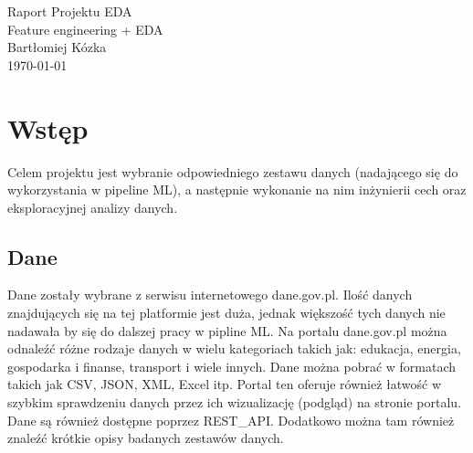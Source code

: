 \documentclass[10pt,a4paper]{article}
\begin{document}
\begin{titlepage}
    \centering
    \vspace*{1cm} %

    {\Huge Raport Projektu EDA} \\[1.5cm]

    {\Large Feature engineering + EDA} \\[2cm]

    {\large Bartłomiej Kózka} \\[0.5cm]

    {\large \today} %

    \vfill

\end{titlepage}


\justifying


\section{Wstęp}
Celem projektu jest wybranie odpowiedniego zestawu danych (nadającego się do wykorzystania w pipeline ML), a następnie wykonanie na nim inżynierii cech oraz eksploracyjnej analizy danych.
\subsection*{Dane}
Dane zostały wybrane z serwisu internetowego dane.gov.pl. Ilość danych znajdujących się na tej platformie jest duża, jednak większość tych danych nie nadawała by się do dalszej pracy w pipline ML. 
Na portalu dane.gov.pl można odnaleźć różne rodzaje danych w wielu kategoriach takich jak: edukacja, energia, gospodarka i finanse, transport i wiele innych. Dane można pobrać w formatach takich jak CSV, JSON, XML, Excel itp. Portal ten oferuje również łatwość w szybkim sprawdzeniu danych przez ich wizualizację (podgląd) na stronie portalu. Dane są również dostępne poprzez REST\_API. Dodatkowo można tam również znaleźć krótkie opisy badanych zestawów danych.
\end{document}
